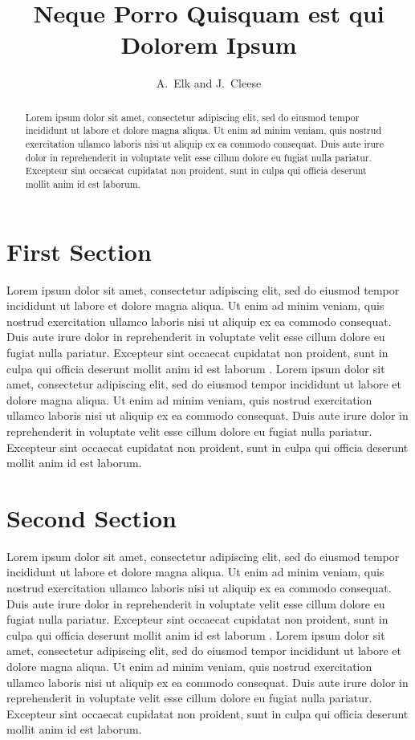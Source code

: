\documentclass{iaeapaper}
\title{Neque Porro Quisquam est qui Dolorem Ipsum}
\author{A.~Elk and J.~Cleese}
\affil{The University}
\begin{document}
\maketitle

\begin{abstract}
Lorem ipsum dolor sit amet, consectetur adipiscing elit, sed do eiusmod tempor 
incididunt ut labore et dolore magna aliqua. Ut enim ad minim veniam, quis nostrud 
exercitation ullamco laboris nisi ut aliquip ex ea commodo consequat. Duis aute 
irure dolor in reprehenderit in voluptate velit esse cillum dolore eu fugiat nulla 
pariatur. Excepteur sint occaecat cupidatat non proident, sunt in culpa qui officia 
deserunt mollit anim id est laborum.
\end{abstract}

\section{First Section}

Lorem ipsum dolor sit amet, consectetur adipiscing elit, sed do eiusmod tempor 
incididunt ut labore et dolore magna aliqua. Ut enim ad minim veniam, quis nostrud 
exercitation ullamco laboris nisi ut aliquip ex ea commodo consequat. Duis aute 
irure dolor in reprehenderit in voluptate velit esse cillum dolore eu fugiat nulla 
pariatur. Excepteur sint occaecat cupidatat non proident, sunt in culpa qui officia 
deserunt mollit anim id est laborum \cite{howard:2012}.
Lorem ipsum dolor sit amet, consectetur adipiscing elit, sed do eiusmod tempor 
incididunt ut labore et dolore magna aliqua. Ut enim ad minim veniam, quis nostrud 
exercitation ullamco laboris nisi ut aliquip ex ea commodo consequat. Duis aute 
irure dolor in reprehenderit in voluptate velit esse cillum dolore eu fugiat nulla 
pariatur. Excepteur sint occaecat cupidatat non proident, sunt in culpa qui officia 
deserunt mollit anim id est laborum.

\section{Second Section}

Lorem ipsum dolor sit amet, consectetur adipiscing elit, sed do eiusmod tempor 
incididunt ut labore et dolore magna aliqua. Ut enim ad minim veniam, quis nostrud 
exercitation ullamco laboris nisi ut aliquip ex ea commodo consequat. Duis aute 
irure dolor in reprehenderit in voluptate velit esse cillum dolore eu fugiat nulla 
pariatur. Excepteur sint occaecat cupidatat non proident, sunt in culpa qui officia 
deserunt mollit anim id est laborum \cite{casati:2009}.
Lorem ipsum dolor sit amet, consectetur adipiscing elit, sed do eiusmod tempor 
incididunt ut labore et dolore magna aliqua. Ut enim ad minim veniam, quis nostrud 
exercitation ullamco laboris nisi ut aliquip ex ea commodo consequat. Duis aute 
irure dolor in reprehenderit in voluptate velit esse cillum dolore eu fugiat nulla 
pariatur. Excepteur sint occaecat cupidatat non proident, sunt in culpa qui officia 
deserunt mollit anim id est laborum.



\end{document}
